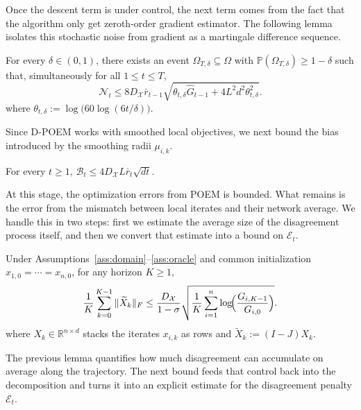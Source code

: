 \documentclass[runningheads]{llncs}
\newcommand{\Prob}{\mathbb{P}}
\begin{document}
Once the descent term is under control, the next term comes from the
fact that the algorithm only  get zeroth-order gradient estimator. The
following lemma isolates this stochastic noise from gradient as 
a martingale difference sequence.

\begin{lemma}\label{lem:dec-noise}
For every \(\delta\in(0,1)\), there exists an event \(\Omega_{T,\delta}\subseteq \Omega\)
with \(\Prob(\Omega_{T,\delta})\ge 1-\delta\) such that, simultaneously for all
\(1\le t\le T\),
\[
\mathcal N_t
\le
8D_{\mathcal{X}}\bar r_{t-1}
\sqrt{\theta_{t,\delta}\hat G_{t-1}+4L^2d^2\theta_{t,\delta}^2}.
\]
where \(\theta_{t,\delta}:=\log\!\bigl(60\log(6t/\delta)\bigr)\).
\end{lemma}

Since D-POEM works with smoothed local objectives, we next bound the bias
introduced by the smoothing radii \(\mu_{i,k}\).

\begin{lemma}\label{lem:smoothing-bias}
For every \(t\ge 1\),
\(
\mathcal B_t
\le
4D_{\mathcal{X}}L\bar r_t\sqrt{dt}.
\)
\end{lemma}

At this stage, the optimization errors from POEM is bounded.
What remains is the error from the mismatch
between local iterates and their network average. We handle this in two steps:
first we estimate the average size of the disagreement process itself, and
then we convert that estimate into a bound on \(\mathcal E_t\).

\begin{lemma}\label{lem:avg-consensus-A}
Under Assumptions~\ref{ass:domain}--\ref{ass:oracle} and common initialization
\(x_{1,0}=\cdots=x_{n,0}\), for any horizon \(K\ge 1\),
\[
\frac{1}{K}\sum_{k=0}^{K-1}\|\widetilde X_k\|_F
\le
\frac{D_{\mathcal{X}}}{1-\sigma}
\sqrt{\frac{1}{K}\sum_{i=1}^{n}\log\!\Bigl(\frac{G_{i,K-1}}{G_{i,0}}\Bigr)}.
\]
where \(X_k\in\mathbb R^{n\times d}\) stacks the iterates \(x_{i,k}\) as rows
and \(\widetilde X_k:=(I-J)X_k\).
\end{lemma}

The previous lemma quantifies how much disagreement can accumulate on
average along the trajectory. The next bound feeds that control back into the
decomposition and turns it into an explicit estimate for the disagreement
penalty \(\mathcal E_t\).
\end{document}
